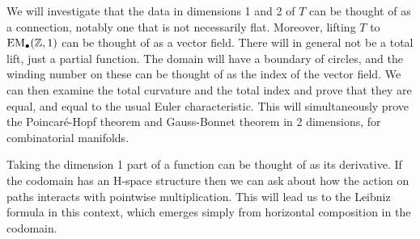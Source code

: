 We will investigate that the data in dimensions 1 and 2 of \( T \) can be thought of as a connection, notably one that is not necessarily flat. Moreover, lifting \( T \) to \( \mathrm{EM_{\bullet}}(\mathbb{Z},1) \) can be thought of as a vector field. There will in general not be a total lift, just a partial function. The domain will have a boundary of circles, and the winding number on these can be thought of as the index of the vector field. We can then examine the total curvature and the total index and prove that they are equal, and equal to the usual Euler characteristic. This will simultaneously prove the Poincaré-Hopf theorem and Gauss-Bonnet theorem in 2 dimensions, for combinatorial manifolds.

Taking the dimension 1 part of a function can be thought of as its derivative. If the codomain has an H-space structure then we can ask about how the action on paths interacts with pointwise multiplication. This will lead us to the Leibniz formula in this context, which emerges simply from horizontal composition in the codomain.


